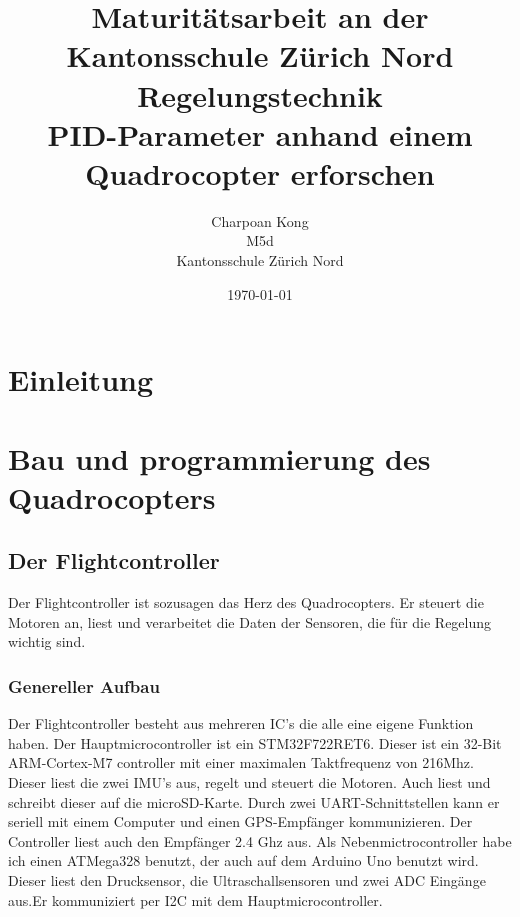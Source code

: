 \documentclass[12pt,a4paper, ngerman]{article}
\begin{document}

\title{\large Maturitätsarbeit an der Kantonsschule Zürich Nord \\ \Huge Regelungstechnik \\ \huge PID-Parameter anhand einem Quadrocopter erforschen}
\date{\today}
\author{Charpoan Kong \\ M5d \\ Kantonsschule Zürich Nord}
\maketitle
{}

\newpage
\clearpage
{}
\tableofcontents
\newpage
{}

\section{Einleitung}

\newpage
\section{Bau und programmierung des Quadrocopters}
\subsection{Der Flightcontroller}
Der Flightcontroller ist sozusagen das Herz des Quadrocopters. Er steuert die Motoren an, liest und verarbeitet die Daten der Sensoren, die für die Regelung wichtig sind.
\subsubsection{Genereller Aufbau}
Der Flightcontroller besteht aus mehreren IC's die alle eine eigene Funktion haben. Der Hauptmicrocontroller ist ein STM32F722RET6. Dieser ist ein 32-Bit ARM-Cortex-M7 controller mit einer maximalen Taktfrequenz von 216Mhz. Dieser liest die zwei IMU's aus, regelt und steuert die Motoren. Auch liest und schreibt dieser auf die microSD-Karte. Durch zwei UART-Schnittstellen kann er seriell mit einem Computer und einen GPS-Empfänger kommunizieren. Der Controller liest auch den Empfänger 2.4 Ghz aus. Als Nebenmictrocontroller habe ich einen ATMega328 benutzt, der auch auf dem Arduino Uno benutzt wird. Dieser liest den Drucksensor, die Ultraschallsensoren und zwei ADC Eingänge aus.Er kommuniziert per I2C mit dem Hauptmicrocontroller.
\end{document}
